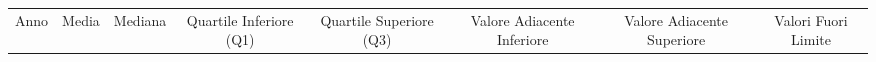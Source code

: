 \begin{tabular}{cccccccc}
\toprule
\multirow{3}{*}{\parbox{16mm}{\centering Anno}} &
\multirow{3}{*}{\parbox{16mm}{\centering Media}} &
\multirow{3}{*}{\parbox{16mm}{\centering Mediana}} &
\multirow{3}{*}{\parbox{16mm}{\centering Quartile Inferiore (Q1)}} &
\multirow{3}{*}{\parbox{16mm}{\centering Quartile Superiore (Q3)}} &
\multirow{3}{*}{\parbox{16mm}{\centering Valore Adiacente Inferiore}} &
\multirow{3}{*}{\parbox{16mm}{\centering Valore Adiacente Superiore}} &
\multirow{3}{*}{\parbox{16mm}{\centering Valori Fuori Limite}}
\\

\\

\\

\midrule

\bottomrule
\end{tabular}

